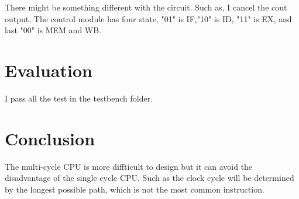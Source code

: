 \documentclass[12pt,a4paper]{article}
\begin{document}
There might be something different with the circuit.
Such as, I cancel the cout output.
The control module has four state, "01" is IF,"10" is ID, "11" is EX, and last "00" is MEM and WB.
\newpage

\section{Evaluation}

I pass all the test in the testbench folder.





\section{Conclusion}

The multi-cycle CPU is more diffticult to design but it can avoid the disadvantage of the single cycle CPU.
Such as the clock cycle will be determined by the longest possible path, which is not the most common instruction. 
\end{document}
